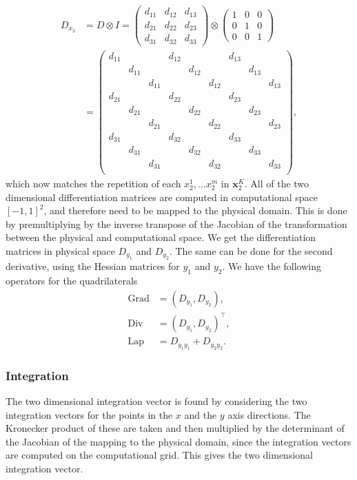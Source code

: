 \documentclass[11pt, a4paper]{article}
\theoremstyle{definition}
\DeclareMathOperator{\Grad}{Grad}
\DeclareMathOperator{\Div}{Div}
\DeclareMathOperator{\Lap}{Lap}
\begin{document}
\begin{align*}
	D_{x_2}&=D \otimes I = 
	\begin{pmatrix}
		d_{11} & d_{12} & d_{13}\\
		d_{21} & d_{22} & d_{23} \\
		d_{31} & d_{32} & d_{33}
	\end{pmatrix}
	\otimes
	\begin{pmatrix}
		1 & 0 & 0\\
		0 & 1 & 0 \\
		0 & 0 & 1
	\end{pmatrix}
	\\&=
	\begin{pmatrix}
		d_{11} & & & d_{12} & & & d_{13} & & \\
		& d_{11} & & & d_{12} & & &  d_{13} & \\
		& & d_{11} & & &  d_{12} &  & & d_{13}\\
		d_{21} & & & d_{22} & & & d_{23} & & \\
		& d_{21} & & & d_{22} & & &  d_{23} & \\
		& & d_{21} & & &  d_{22} &  & & d_{23}\\
		d_{31} & & & d_{32} & & & d_{33} & & \\
		& d_{31} & & & d_{32} & & &  d_{33} & \\
		& & d_{31} & & &  d_{32} &  & & d_{33}\\
	\end{pmatrix},
\end{align*}
which now matches the repetition of each $x_2^1,...x_2^m$ in $\mathbf{x}_2^{K}$.
All of the two dimensional differentiation matrices are computed in computational space $[-1,1]^2$, and therefore need to be mapped to the physical domain. This is done by premultiplying by the inverse transpose of the Jacobian of the transformation between the physical and computational space. We get the differentiation matrices in physical space $D_{y_1}$ and $D_{y_2}$. The same can be done for the second derivative, using the Hessian matrices for $y_1$ and $y_2$.
We have the following operators for the quadrilaterals
\begin{align*}
	\Grad &= \left(D_{y_1}, D_{y_2}\right),\\
	\Div &=\left(D_{y_1}, D_{y_2}\right)^\top,\\
	\Lap &= D_{y_1y_1} + D_{y_2y_2}.
\end{align*}

\subsubsection{Integration}
The two dimensional integration vector is found by considering the two integration vectors for the points in the $x$ and the $y$ axis directions. The Kronecker product of these are taken and then multiplied by the determinant of the Jacobian of the mapping to the physical domain, since the integration vectors are computed on the computational grid. This gives the two dimensional integration vector.
\end{document}
